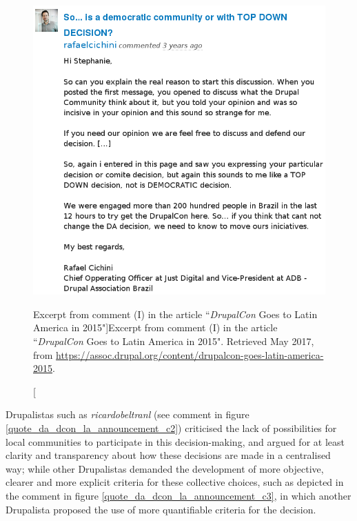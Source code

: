 \begin{figure}[H]
  \centering
\includegraphics[scale=0.45]{img/quotes_replacement/dcon_la_2015_02.png}
\caption[Excerpt from comment (I) in the article ``\textit{DrupalCon} Goes to Latin America in 2015"]{Excerpt from comment (I) in the article ``\textit{DrupalCon} Goes to Latin America in 2015". Retrieved  May 2017, from \url{https://assoc.drupal.org/content/drupalcon-goes-latin-america-2015}.}
\label{quote_da_dcon_la_announcement_c1}
\end{figure}

Drupalistas such as \textsl{ricardobeltranl} (see comment in figure \ref{quote_da_dcon_la_announcement_c2}) criticised the lack of possibilities for local communities to participate in this decision-making, and argued for at least clarity and transparency about how these decisions are made in a centralised way; while other Drupalistas demanded the development of more objective, clearer and more explicit criteria for these collective choices, such as depicted in the comment in figure \ref{quote_da_dcon_la_announcement_c3}, in which another Drupalista proposed the use of more quantifiable criteria for the decision.

